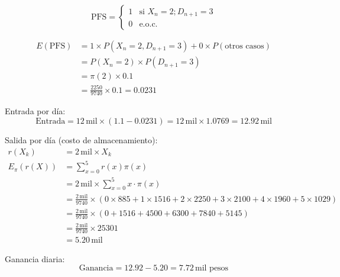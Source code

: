 \documentclass[12pt,a4paper]{article}
\begin{document}
\begin{equation*}
\text{PFS} = \begin{cases}
1 & \text{si } X_n = 2; D_{n+1} = 3 \\
0 & \text{e.o.c.}
\end{cases}
\end{equation*}

\begin{align*}
E(\text{PFS}) &= 1 \times P(X_n = 2, D_{n+1} = 3) + 0 \times P(\text{otros casos}) \\
&= P(X_n = 2) \times P(D_{n+1} = 3) \\
&= \pi(2) \times 0.1 \\
&= \frac{2250}{9740} \times 0.1 = 0.0231
\end{align*}

Entrada por día:
\begin{equation*}
\text{Entrada} = 12\,\text{mil} \times (1.1 - 0.0231) = 12\,\text{mil} \times 1.0769 = 12.92\,\text{mil}
\end{equation*}

Salida por día (costo de almacenamiento):
\begin{align*}
r(X_k) &= 2\,\text{mil} \times X_k \\
E_{\pi}(r(X)) &= \sum_{x=0}^{5} r(x) \pi(x) \\
&= 2\,\text{mil} \times \sum_{x=0}^{5} x \cdot \pi(x) \\
&= \frac{2\,\text{mil}}{9740} \times (0 \times 885 + 1 \times 1516 + 2 \times 2250 + 3 \times 2100 + 4 \times 1960 + 5 \times 1029) \\
&= \frac{2\,\text{mil}}{9740} \times (0 + 1516 + 4500 + 6300 + 7840 + 5145) \\
&= \frac{2\,\text{mil}}{9740} \times 25301 \\
&= 5.20\,\text{mil}
\end{align*}

Ganancia diaria:
\begin{equation*}
\text{Ganancia} = 12.92 - 5.20 = 7.72\,\text{mil pesos}
\end{equation*}
\end{document}
